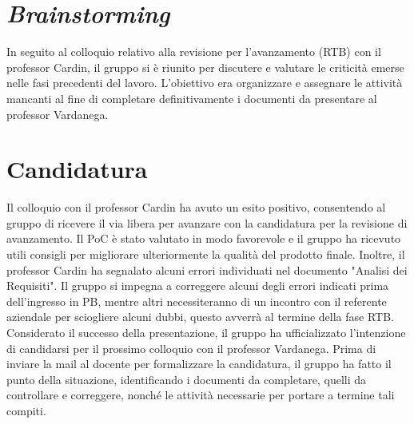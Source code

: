 \section{\textit{Brainstorming}}
In seguito al colloquio relativo alla revisione per l'avanzamento (RTB) con il professor Cardin, il gruppo si è riunito per discutere e valutare le criticità emerse nelle fasi precedenti del lavoro. 
L'obiettivo era organizzare e assegnare le attività mancanti al fine di completare definitivamente i documenti da presentare al professor Vardanega.

\section{Candidatura}
Il colloquio con il professor Cardin ha avuto un esito positivo, consentendo al gruppo di ricevere il via libera per avanzare con la candidatura per la revisione di avanzamento.
Il PoC è stato valutato in modo favorevole e il gruppo ha ricevuto utili consigli per migliorare ulteriormente la qualità del prodotto finale. 
Inoltre, il professor Cardin ha segnalato alcuni errori individuati nel documento "Analisi dei Requisiti". 
Il gruppo si impegna a correggere alcuni degli errori indicati prima dell'ingresso in PB, mentre altri necessiteranno di un incontro con il referente aziendale per sciogliere alcuni dubbi, questo avverrà al termine della fase RTB.\\
Considerato il successo della presentazione, il gruppo ha ufficializzato l'intenzione di candidarsi per il prossimo colloquio con il professor Vardanega. 
Prima di inviare la mail al docente per formalizzare la candidatura, il gruppo ha fatto il punto della situazione, identificando i documenti da completare, 
quelli da controllare e correggere, nonché le attività necessarie per portare a termine tali compiti.